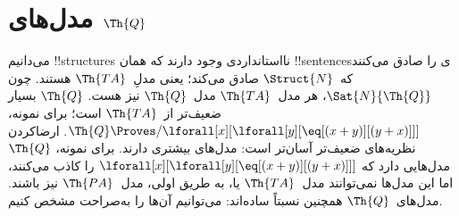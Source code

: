 \documentclass[../../../include/open-logic-section]{subfiles}
\begin{document}
\section{مدل‌های $\Th{Q}$}

\begin{explain}
می‌دانیم !!{structure}s نااستانداردی وجود دارند که همان !!{sentence}sی
را صادق می‌کنند که~$\Struct{N}$ صادق می‌کند؛ یعنی مدلِ~$\Th{TA}$
هستند. چون $\Sat{N}{\Th{Q}}$، هر مدل~$\Th{TA}$ مدل~$\Th{Q}$ نیز
هست. $\Th{Q}$ بسیار ضعیف‌تر از~$\Th{TA}$ است؛ برای نمونه،
$\Th{Q} \Proves/ \lforall[x][\lforall[y][\eq[(x +
      y)][(y+x)]]]$. ارضاکردن نظریه‌های ضعیف‌تر آسان‌تر است: مدل‌های
بیشتری دارند. برای نمونه، $\Th{Q}$ مدل‌هایی دارد که
$\lforall[x][\lforall[y][\eq[(x + y)][(y+x)]]]$ را کاذب می‌کنند، اما
این مدل‌ها نمی‌توانند مدل~$\Th{TA}$ یا، به طریق اولی، مدل~$\Th{PA}$
نیز باشند. مدل‌های~$\Th{Q}$ همچنین نسبتاً ساده‌اند: می‌توانیم آن‌ها را
به‌صراحت مشخص کنیم.
\end{explain}
\end{document}
